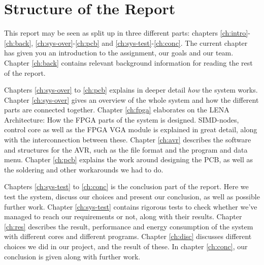 \section{Structure of the Report}

This report may be seen as split up in three different parts: chapters
\ref{ch:intro}-\ref{ch:back}, \ref{ch:sys-over}-\ref{ch:pcb} and
\ref{ch:sys-test}-\ref{ch:conc}.  The
current chapter has given you an introduction to the assignment, our goals and
our team. Chapter \ref{ch:back} contains relevant background information for
reading the rest of the report.

Chapters \ref{ch:sys-over} to \ref{ch:pcb} explains in deeper detail {\em how}
the system works. Chapter \ref{ch:sys-over} gives an
overview of the whole system and how the different parts are connected
together. Chapter \ref{ch:fpga} elaborates on the LENA Architecture: How the
FPGA parts of the system is designed. SIMD-nodes, control core as well as the
FPGA VGA module is explained in great detail, along with the interconnection
between these. Chapter \ref{ch:avr} describes the software and structures for
the AVR, such as the file format and the program and data menu. Chapter
\ref{ch:pcb} explains the work around designing the PCB, as well as the
soldering and other workarounds we had to do.

Chapters \ref{ch:sys-test} to \ref{ch:conc} is the conclusion part of the
report. Here we test the system, discuss our choices and present our conclusion,
as well as possible further work. Chapter \ref{ch:sys-test} contains rigorous
tests to check whether we've managed to reach our requirements or not, along
with their results. Chapter \ref{ch:res} describes the result, performance and
energy consumption of the system with different cores and different
programs. Chapter \ref{ch:disc} discusses different choices we did in our
project, and the result of these. In chapter \ref{ch:conc}, our conclusion is
given along with further work.

